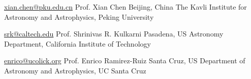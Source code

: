 


\begin{cvreferences}
	
\cvreference
	{\href{mailto:xian.chen@pku.edu.cn}{\faEnvelope\acvHeaderIconSep xian.chen@pku.edu.cn}} %
	{Prof. Xian Chen} %
	{Beijing, China} %
	{The Kavli Institute for Astronomy and Astrophysics, Peking University} %
	
	
	
\cvreference
{\href{mailto:srk@caltech.edu}{\faEnvelope\acvHeaderIconSep srk@caltech.edu}} %
{Prof. Shrinivas R. Kulkarni} %
{Pasadena, US} %
{Astronomy Department, California Institute of Technology} %


	
\cvreference
{\href{mailto:enrico@ucolick.org}{\faEnvelope\acvHeaderIconSep enrico@ucolick.org}} %
{Prof. Enrico Ramirez-Ruiz} %
{Santa Cruz, US} %
{Department of Astronomy and Astrophysics, UC Santa Cruz} %


\end{cvreferences}